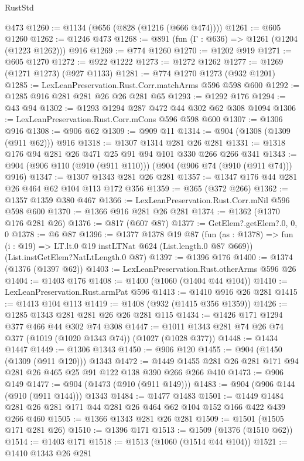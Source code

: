 \begin{lexlean}{RustStd}
\begin{coremodule}
    @473
@1260 := @1134 (@656 (@828 (@1216 (@666 @474))))
@1261 := @605 @1260
@1262 := @1246 @473
@1268 := @891 (fun (Γ : @636) => @1261 (@1204 (@1223 @1262))) @916
@1269 := @774 @1260
@1270 := @1202 @919
@1271 := @605 @1270
@1272 := @922 @1222
@1273 := @1272 @1262
@1277 := @1269 (@1271 @1273) (@927 @1133)
@1281 := @774 @1270 @1273 (@932 @1201)
@1285 := LexLeanPreservation.Rust.Corr.matchArms @596 @598 @600
@1292 := @1285 @916 @281 @281 @26 @26 @281 @65
@1293 := @1292 @176
@1294 := @43 @94
@1302 := @1293 @1294 @287 @472 @44 @302 @62 @308 @1094
@1306 := LexLeanPreservation.Rust.Corr.mCons @596 @598 @600
@1307 := @1306 @916
@1308 := @906 @62
@1309 := @909 @11
@1314 := @904 (@1308 (@1309 (@911 @62))) @916
@1318 := @1307 @1314 @281 @26 @281
@1331 := @1318 @176 @94 @281 @26 @471 @25 @91 @94 @101 @330 @266 @266 @341
@1343 := @904 (@906 @110 (@910 (@911 @110))) (@904 (@906 @74 (@910 (@911 @74))) @916)
@1347 := @1307 @1343 @281 @26 @281
@1357 := @1347 @176 @44 @281 @26 @464 @62 @104 @113 @172 @356
@1359 := @365 (@372 @266)
@1362 := @1357 @1359 @380 @467
@1366 := LexLeanPreservation.Rust.Corr.mNil @596 @598 @600
@1370 := @1366 @916 @281 @26 @281
@1374 := @1362 (@1370 @176 @281 @26)
@1376 := @817 (@607 @87)
@1377 := GetElem?.getElem?.{0, 0, 0}
@1378 := @6 @87
@1396 := @1377
    @1378
    @19
    @87
    (fun (as : @1378) => fun (i : @19) => LT.lt.{0} @19 instLTNat @624 (List.length.{0} @87 @669))
    (List.instGetElem?NatLtLength.{0} @87)
@1397 := @1396 @176
@1400 := @1374 (@1376 (@1397 @62))
@1403 := LexLeanPreservation.Rust.otherArms @596 @26
@1404 := @1403 @176
@1408 := @1400 (@1060 (@1404 @44 @104))
@1410 := LexLeanPreservation.Rust.armPat @596
@1413 := @1410 @916 @26 @281
@1415 := @1413 @104 @113
@1419 := @1408 (@932 (@1415 @356 @1359))
@1426 := @1285 @1343 @281 @281 @26 @26 @281 @115
@1434 := @1426 @171 @1294 @377 @466 @44 @302 @74 @308
@1447 := @1011 @1343 @281 @74 @26 @74 @377 (@1019 (@1020 @1343 @74)) (@1027 (@1028 @377))
@1448 := @1434 @1447
@1449 := @1306 @1343
@1450 := @906 @120
@1455 := @904 (@1450 (@1309 (@911 @120))) @1343
@1472 := @1449 @1455 @281 @26 @281 @171 @94 @281 @26 @465 @25 @91 @122 @138 @390 @266 @266 @410
@1473 := @906 @149
@1477 := @904 (@1473 (@910 (@911 @149)))
@1483 := @904 (@906 @144 (@910 (@911 @144))) @1343
@1484 := @1477 @1483
@1501 := @1449 @1484 @281 @26 @281 @171 @44 @281 @26 @464 @62 @104 @152 @166 @422 @439 @266 @460
@1505 := @1366 @1343 @281 @26 @281
@1509 := @1501 (@1505 @171 @281 @26)
@1510 := @1396 @171
@1513 := @1509 (@1376 (@1510 @62))
@1514 := @1403 @171
@1518 := @1513 (@1060 (@1514 @44 @104))
@1521 := @1410 @1343 @26 @281

\end{coremodule}
\end{lexlean}
